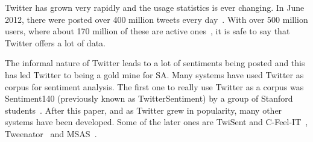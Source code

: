 Twitter has grown very rapidly and the usage statistics is ever changing. In June 2012, there were posted over 400 million tweets every day~\citep{site:twitterusage}. With over 500 million users, where about 170 million of these are active ones~\citep{site:users}, it is safe to say that Twitter offers a lot of data.


The informal nature of Twitter leads to a lot of sentiments being posted and this has led Twitter to being a gold mine for SA. Many systems have used Twitter as corpus for sentiment analysis. The first one to really use Twitter as a corpus was Sentiment140 (previously known as TwitterSentiment) by a group of Stanford students~\citep{article:go}. After this paper, and as Twitter grew in popularity, many other systems have been developed. Some of the later ones are TwiSent and C-Feel-IT~\citep{mukherjee2012twisent}, Tweenator~\citep{saif2012semantic} and MSAS~\citep{chamlertwat2012discovering}.